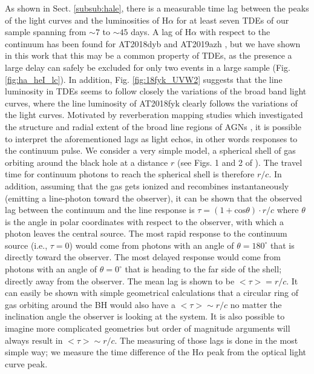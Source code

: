\documentclass[structabstract]{aa}
\begin{document}
As shown in Sect. \ref{subsub:hale}, there is a measurable time lag between the peaks of the light curves and the luminosities of H$\alpha$ for at least seven TDEs of our sample spanning from $\sim7$ to $\sim45$ days. A lag of H$\alpha$ with respect to the continuum has been found for AT2018dyb \citep{Holoien2020} and AT2019azh \citep{Hinkle2021}, %
but we have shown in this work that this may be a common property of TDEs, as the presence a large delay can safely be excluded for only two events in a large sample (Fig. \ref{fig:ha_heI_lc}). In addition, Fig. \ref{fig:18fyk_UVW2} suggests that the line luminosity in TDEs seems to follow closely the variations of the broad band light curves, where the line luminosity of AT2018fyk clearly follows the variations of the light curves. Motivated by reverberation mapping studies which investigated the structure and radial extent of the broad line regions of AGNs \citep{Peterson1993}, it is possible to interpret the aforementioned lags as light echos, in other words responses to the continuum pulse. 
We consider a very simple model, a spherical shell of gas orbiting around the black hole at a distance $r$ (see Figs. 1 and 2 of \citealt{Peterson1993}). 
The travel time for continuum photons to reach the spherical shell is therefore $r/c$. In addition, assuming that the gas gets ionized and recombines instantaneously (emitting a line-photon toward the observer), it can be shown that the observed lag between the continuum and the line response is $\tau = (1 + \mathrm{cos}\theta )\cdot r/c$ \citep{Peterson1993} where $\theta$ is the angle in polar coordinates with respect to the observer, with which a photon leaves the central source. The most rapid response to the continuum source (i.e., $\tau=0$) would come from photons with an angle of $\theta=180^{\circ}$ that is directly toward the observer. The most delayed response would come from photons with an angle of $\theta=0^{\circ}$ that is heading to the far side of the shell; directly away from the observer.
The mean lag is shown to be $<\tau>=r/c$. 
It can easily be shown with simple geometrical calculations that a circular ring of gas orbiting around the BH would also have a $<\tau> \sim r/c$ no matter the inclination angle the observer is looking at the system.
It is also possible to imagine more complicated geometries but order of magnitude arguments will always result in $<\tau> \sim r/c$. The measuring of those lags is done in the most simple way; we measure the time difference of the H$\alpha$ peak from the optical light curve peak.
\end{document}
